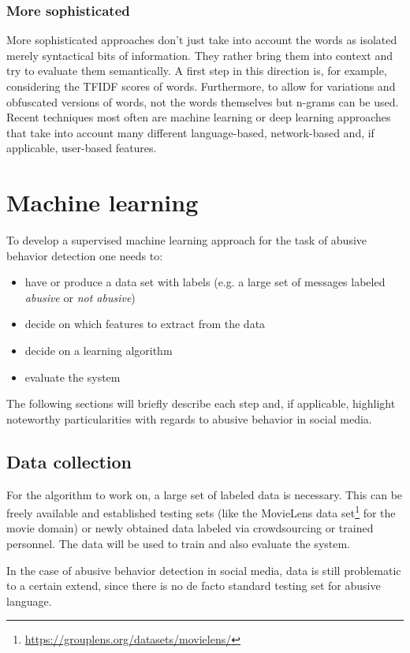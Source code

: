 \documentclass{proseminar}
\begin{document}
\subsubsection{More sophisticated} More sophisticated approaches don't just take into account the words as isolated merely syntactical bits of information. They rather bring them into context and try to evaluate them semantically. A first step in this direction is, for example, considering the TFIDF scores of words. Furthermore, to allow for variations and obfuscated versions of words, not the words themselves but n-grams can be used\cite{Yin:2009}. Recent techniques most often are machine learning\cite{Yahoo:2016}\cite{Twitter:2017} or deep learning\cite{DeepLearning:2017} approaches that take into account many different language-based, network-based and, if applicable, user-based features.

\section{Machine learning}
To develop a supervised machine learning approach for the task of abusive behavior detection one needs to:
\begin{itemize}
\item have or produce a data set with labels (e.g. a large set of messages labeled \emph{abusive} or \emph{not abusive})
\item decide on which features to extract from the data
\item decide on a learning algorithm
\item evaluate the system
\end{itemize}
The following sections will briefly describe each step and, if applicable, highlight noteworthy particularities with regards to abusive behavior in social media.

\subsection{Data collection}
For the algorithm to work on, a large set of labeled data is necessary. This can be freely available and established testing sets (like the MovieLens data set\footnote{\url{https://grouplens.org/datasets/movielens/}} for the movie domain) or newly obtained data labeled via crowdsourcing or trained personnel. The data will be used to train and also evaluate the system.

In the case of abusive behavior detection in social media, data is still problematic to a certain extend, since there is no de facto standard testing set for abusive language\cite{Yahoo:2016}.
\end{document}
